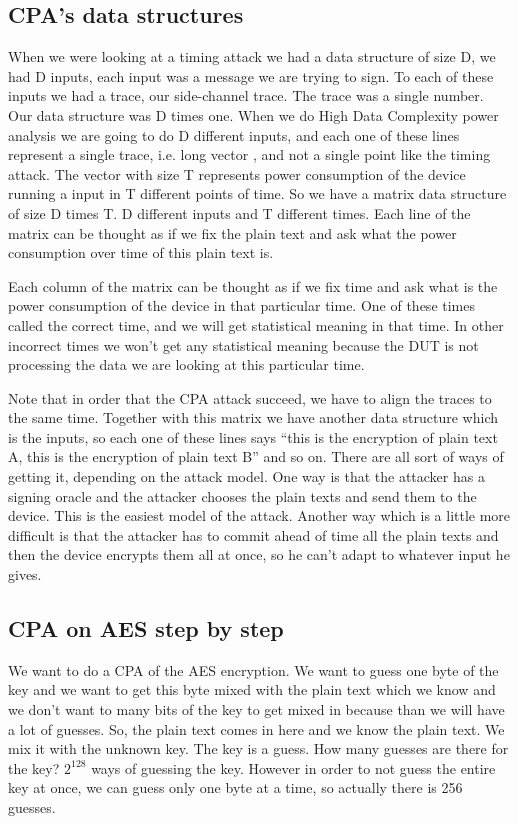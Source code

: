 \subsection{CPA's data structures}\label{c8_CPA_data_structures:subsec}

When we were looking at a timing attack we had a data structure of size D, we
had D inputs, each input was a message we are trying to sign. To each of these
inputs we had a trace, our side-channel trace. The trace was a single number.
Our data structure was D times one. When we do High Data Complexity power
analysis we are going to do D different inputs, and each one of these lines
represent a single trace, i.e. long vector , and not a single point like the
timing attack. The vector with size T represents power consumption of the device
running a input in T different points of time. So we have a matrix data
structure of size D times T. D different inputs and T different times. Each line
of the matrix can be thought as if we fix the plain text and ask what the power
consumption over time of this plain text is.

Each column of the matrix can be thought as if we fix time and ask what is the
power consumption of the device in that particular time. One of these times
called the correct time, and we will get statistical meaning in that time. In
other incorrect times we won't get any statistical meaning because the DUT is
not processing the data we are looking at this particular time.

Note that in order that the CPA attack succeed, we have to align the traces to
the same time. Together with this matrix we have another data structure which is
the inputs, so each one of these lines says “this is the encryption of plain
text A, this is the encryption of plain text B” and so on. There are all sort of
ways of getting it, depending on the attack model. One way is that the attacker
has a signing oracle and the attacker chooses the plain texts and send them to
the device. This is the easiest model of the attack. Another way which is a
little more difficult is that the attacker has to commit ahead of time all the
plain texts and then the device encrypts them all at once, so he can't adapt to
whatever input he gives.

\subsection{CPA on AES step by step}\label{c8_CPA_overview:subsec}

We want to do a CPA of the AES encryption. We want to guess one byte of the key
and we want to get this byte mixed with the plain text which we know and we
don't want to many bits of the key to get mixed in because than we will have a
lot of guesses. So, the plain text comes in here and we know the plain text. We
mix it with the unknown key. The key is a guess. How many guesses are there for
the key?  $2^{128}$ ways of guessing the key. However in order to not guess the
entire key at once, we can guess only one byte at a time, so actually there is
256 guesses. 

